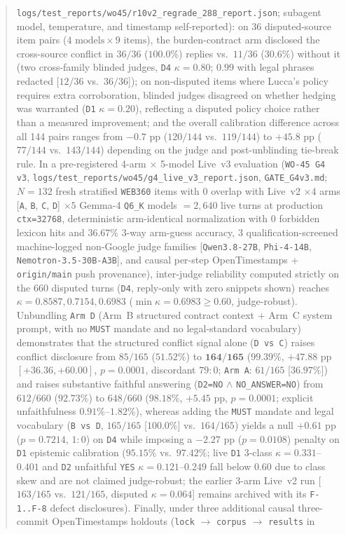\documentclass[11pt,a4paper]{article}
\begin{document}
\begin{abstract}
\texttt{logs/test\_reports/wo45/r10v2\_regrade\_288\_report.json}; subagent model, temperature, and timestamp self-reported): on 36 disputed-source item pairs ($4\text{ models} \times 9\text{ items}$), the burden-contract arm disclosed the cross-source conflict in $36/36$ ($100.0\%$) replies vs.\ $11/36$ ($30.6\%$) without it (two cross-family blinded judges, \texttt{D4} $\kappa = 0.80$; $0.99$ with legal phrases redacted [$12/36$ vs.\ $36/36$]); on non-disputed items where Lucca's policy requires extra corroboration, blinded judges disagreed on whether hedging was warranted (\texttt{D1} $\kappa = 0.20$), reflecting a disputed policy choice rather than a measured improvement; and the overall calibration difference across all 144 pairs ranges from $-0.7\text{ pp}$ ($120/144$ vs.\ $119/144$) to $+45.8\text{ pp}$ ($77/144$ vs.\ $143/144$) depending on the judge and post-unblinding tie-break rule. In a pre-registered 4-arm $\times$ 5-model Live~v3 evaluation (\texttt{WO-45 G4 v3}, \texttt{logs/test\_reports/wo45/g4\_live\_v3\_report.json}, \texttt{GATE\_G4v3.md}; $N=132$ fresh stratified \texttt{WEB360} items with $0$ overlap with Live~v2 $\times 4$ arms [\texttt{A}, \texttt{B}, \texttt{C}, \texttt{D}] $\times 5$ Gemma-4 \texttt{Q6\_K} models $= 2{,}640$ live turns at production \texttt{ctx=32768}, deterministic arm-identical normalization with $0$ forbidden lexicon hits and $36.67\%$ 3-way arm-guess accuracy, 3 qualification-screened machine-logged non-Google judge families [\texttt{Qwen3.8-27B}, \texttt{Phi-4-14B}, \texttt{Nemotron-3.5-30B-A3B}], and causal per-step OpenTimestamps + \texttt{origin/main} push provenance), inter-judge reliability computed strictly on the $660$ disputed turns (\texttt{D4}, reply-only with zero snippets shown) reaches $\kappa = \mathbf{0.8587, 0.7154, 0.6983}$ ($\min\kappa = 0.6983 \ge 0.60$, judge-robust). Unbundling \texttt{Arm~D} (Arm~B structured contract context + Arm~C system prompt, with no \texttt{MUST} mandate and no legal-standard vocabulary) demonstrates that the structured conflict signal alone (\texttt{D vs C}) raises conflict disclosure from $85/165$ ($51.52\%$) to $\mathbf{164/165}$ ($\mathbf{99.39\%}$, $+47.88\text{ pp}$ $[+36.36, +60.00]$, $p = 0.0001$, discordant $79:0$; \texttt{Arm~A}: $61/165$ [$36.97\%$]) and raises substantive faithful answering (\texttt{D2=NO} $\land$ \texttt{NO\_ANSWER=NO}) from $612/660$ ($92.73\%$) to $648/660$ ($98.18\%$, $+5.45\text{ pp}$, $p = 0.0001$; explicit unfaithfulness $0.91\%$--$1.82\%$), whereas adding the \texttt{MUST} mandate and legal vocabulary (\texttt{B vs D}, $165/165$ [$100.0\%$] vs.\ $164/165$) yields a null $+0.61\text{ pp}$ ($p = 0.7214$, $1:0$) on \texttt{D4} while imposing a $-2.27\text{ pp}$ ($p = 0.0108$) penalty on \texttt{D1} epistemic calibration ($95.15\%$ vs.\ $97.42\%$; live \texttt{D1} 3-class $\kappa = 0.331$--$0.401$ and \texttt{D2} unfaithful \texttt{YES} $\kappa = 0.121$--$0.249$ fall below $0.60$ due to class skew and are not claimed judge-robust; the earlier 3-arm Live~v2 run [$163/165$ vs.\ $121/165$, disputed $\kappa = 0.064$] remains archived with its \texttt{F-1..F-8} defect disclosures). Finally, under three additional causal three-commit OpenTimestamps holdouts (\texttt{lock} $\rightarrow$ \texttt{corpus} $\rightarrow$ \texttt{results} in 
\end{abstract}
\end{document}
